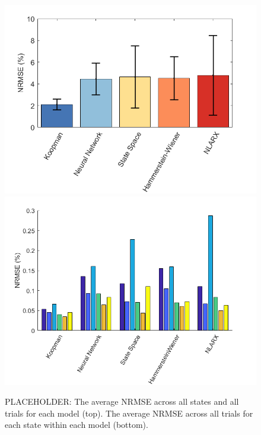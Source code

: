 \begin{figure}
    \centering
    \includegraphics[width=\linewidth]{figures/NRMSE1.png} \\
    \includegraphics[width=\linewidth]{figures/barStates_ph1.png}
    \caption{PLACEHOLDER: The average NRMSE across all states and all trials for each model (top). The average NRMSE across all trials for each state within each model (bottom).}
    \label{fig:comparison}
\end{figure}

